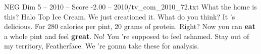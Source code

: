 \begin{textsample}{NEG Dim 5 – 2010 – Score -2.00 – 2010/tv\_com\_2010\_72.txt}  \label{ex:f5_neg_027}
What the home is this?
Halo Top Ice Cream.
We just creationed it.
What do you think?
It 's delicious.
For 280 calories per pint, 20 grams of protein.
Right?
Now you can \textbf{eat} a whole pint and feel \textbf{great}.
No!
You 're supposed to feel ashamed.
Stay out of my territory, Featherface.
We 're gonna take these for analysis.

\end{textsample}
